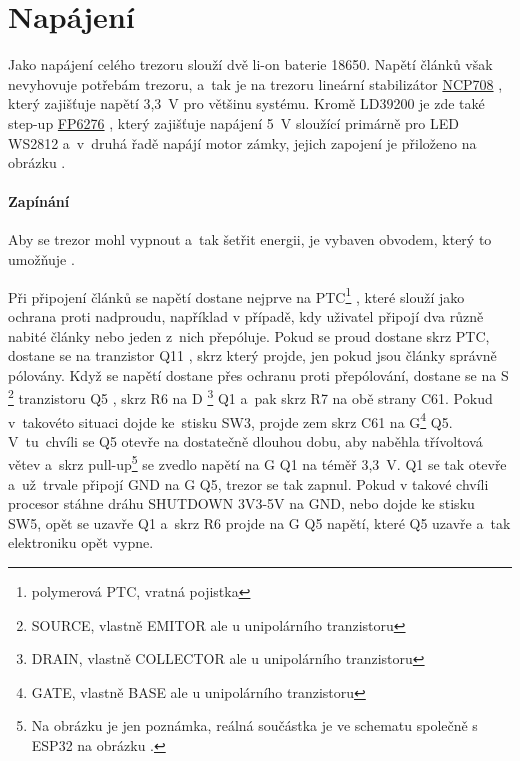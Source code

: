 \section{Napájení}
Jako napájení celého trezoru slouží dvě li-on baterie 18650. Napětí článků však nevyhovuje potřebám trezoru, a~tak je na trezoru lineární 
stabilizátor \href{https://datasheet.lcsc.com/szlcsc/1808280153_STMicroelectronics-LD39200PU33R_C222192.pdf}{NCP708} \parencite{LD39200}, 
který zajišťuje napětí 3,3~V pro většinu systému. Kromě LD39200 je zde také step-up \href{https://datasheet.lcsc.com/szlcsc/Feeling-Tech-FP6276AXR-G1_C83308.pdf}{FP6276} \parencite{fp6276a}, 
který zajišťuje napájení 5~V sloužící primárně pro LED WS2812 a~v~druhá řadě napájí motor zámky,
jejich zapojení je přiloženo na obrázku .

\paragraph*{Zapínání}
Aby se trezor mohl vypnout a~tak šetřit energii, je vybaven obvodem, který to umožňuje .

Při připojení článků se napětí dostane nejprve na PTC\footnote{polymerová PTC, vratná pojistka } \parencite{polifuse},
které slouží jako ochrana proti nadproudu, například v případě, kdy uživatel připojí dva různě nabité články nebo jeden z~nich přepóluje.
Pokud se proud dostane skrz PTC, dostane se na tranzistor Q11 \parencite{power_MOSFET}, skrz který projde, jen pokud jsou články správně pólovány.
Když se napětí dostane přes ochranu proti přepólování, dostane se na S \footnote{SOURCE, vlastně EMITOR ale u unipolárního tranzistoru} 
tranzistoru Q5  \parencite{power_MOSFET}, skrz R6 na D \footnote{DRAIN, vlastně COLLECTOR ale u unipolárního tranzistoru} 
Q1 a~pak skrz R7 na obě strany C61.
Pokud v~takovéto situaci dojde ke~stisku SW3, projde zem skrz C61 na G\footnote{GATE, vlastně BASE ale u unipolárního tranzistoru} Q5.
V~tu~chvíli se Q5 otevře na dostatečně dlouhou dobu, 
aby naběhla třívoltová větev a~skrz pull-up\footnote{Na obrázku je jen poznámka, reálná součástka je ve schematu společně s ESP32 na obrázku .}
se zvedlo napětí na G Q1 na téměř 3,3~V. Q1 se tak otevře a~už~trvale připojí GND na G Q5, trezor se tak zapnul. Pokud v takové chvíli procesor stáhne dráhu SHUTDOWN 3V3-5V 
na GND, nebo dojde ke stisku SW5, opět se uzavře Q1 a~skrz R6 projde na G Q5 napětí, které Q5 uzavře a~tak elektroniku opět vypne.


